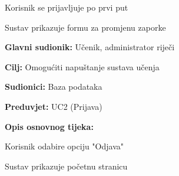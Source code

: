 \begin{packed_item}
\begin{packed_item}
							\item[3.c] Korisnik se prijavljuje po prvi put
							\item[] \begin{packed_enum}
								
								\item Sustav prikazuje formu za promjenu zaporke
								
							\end{packed_enum}
							
							
						\end{packed_item}
					\end{packed_item}
					
						\noindent {}
					\begin{packed_item}
						
						\item \textbf{Glavni sudionik: }Učenik, administrator riječi
						\item  \textbf{Cilj:} Omogućiti napuštanje sustava učenja
						\item  \textbf{Sudionici:} Baza podataka
						\item  \textbf{Preduvjet:} UC2 (Prijava)
						\item  \textbf{Opis osnovnog tijeka:}
						
						\item[] \begin{packed_enum}
							
							\item Korisnik odabire opciju "Odjava"
							\item Sustav prikazuje početnu stranicu
						\end{packed_enum}
					\end{packed_item}
					
